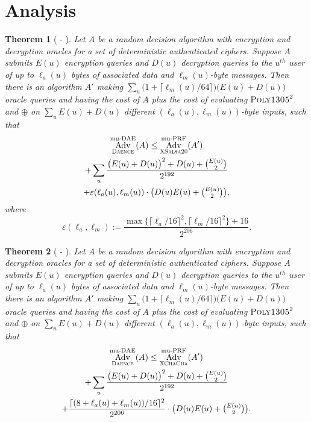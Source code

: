 \documentclass{article}
\newtheorem{theorem}{Theorem}
\def\operatorsc#1{{%
  \ifmmode\let\next=\operatorname\else\let\next=\relax\fi\next{\textsc{#1}}}}
\def\Salsa#1/{\operatorsc{Salsa#1}}
\def\ChaCha#1/{\operatorsc{ChaCha#1}}
\def\XChaCha#1/{\operatorsc{XChaCha#1}}
\def\XSalsa#1/{\operatorsc{XSalsa#1}}
\def\Poly#1/{\operatorsc{Poly#1}}
\def\DAENCE/{\operatorsc{Daence}}
\def\muPRF{%
  \ifmmode\def\next{\operatorname{mu-PRF}}%
    \else\def\next/{mu-\textsc{prf}}%
  \fi\next}
\def\muDAE{%
  \ifmmode\def\next{\operatorname{mu-DAE}}%
    \else\def\next/{mu-\textsc{dae}}%
  \fi\next}
\DeclareMathOperator{\Adv}{Adv}
\newcommand{\collisionbound}{\varepsilon}
\begin{document}
\section{Analysis}

\begin{theorem}[\Salsa20/-\DAENCE/]\label{salsa20-daence}
  Let $A$ be a random decision algorithm with encryption and
   decryption oracles for a set of deterministic authenticated
   ciphers.
  Suppose $A$ submits $E(u)$ encryption queries and $D(u)$ decryption
   queries to the $u^{\mathit{th}}$ user of up to $\ell_a(u)$ bytes of
   associated data and $\ell_m(u)$-byte messages.
  Then there is an algorithm $A'$ making
   $\sum_u \bigl(1 + \lceil\ell_m(u)/64\rceil\bigr)
     \bigl(E(u) + D(u)\bigr)$
   oracle queries and having the cost of $A$ plus the cost of
   evaluating $\Poly1305/^2$ and $\oplus$ on
   $\sum_u E(u) + D(u)$
   different $(\ell_a(u), \ell_m(u))$-byte inputs,
   such that
%
  \begin{multline*}
    \Adv^{\muDAE}_{\DAENCE/}(A)
     \leq \Adv^{\muPRF}_{\XSalsa20/}(A') \\
            + \sum_u
                \frac{\bigl(E(u) + D(u)\bigr)^2 + D(u) + \binom{E(u)}{2}}
                     {2^{192}} \\
                + \collisionbound(\ell_a(u), \ell_m(u))
                  \cdot
                  {\textstyle\bigl(D(u) E(u) + \binom{E(u)}{2}\bigr)},
  \end{multline*}
%
   where
  \[
    \collisionbound(\ell_a, \ell_m)
    := \frac{\max\{\lceil\ell_a/16\rceil^2, \lceil\ell_m/16\rceil^2\}
             + 16}
            {2^{206}}.
  \]
\end{theorem}

\begin{theorem}[\ChaCha/-\DAENCE/]\label{chacha-daence}
  Let $A$ be a random decision algorithm with encryption and
   decryption oracles for a set of deterministic authenticated
   ciphers.
  Suppose $A$ submits $E(u)$ encryption queries and $D(u)$ decryption
   queries to the $u^{\mathit{th}}$ user of up to $\ell_a(u)$ bytes of
   associated data and $\ell_m(u)$-byte messages.
  Then there is an algorithm $A'$ making
   $\sum_u \bigl(1 + \lceil\ell_m(u)/64\rceil\bigr)
     \bigl(E(u) + D(u)\bigr)$
   oracle queries and having the cost of $A$ plus the cost of
   evaluating $\Poly1305/^2$ and $\oplus$ on
   $\sum_u E(u) + D(u)$
   different $(\ell_a(u), \ell_m(u))$-byte inputs,
   such that
%
  \begin{multline*}
    \Adv^{\muDAE}_{\DAENCE/}(A)
     \leq \Adv^{\muPRF}_{\XChaCha/}(A') \\
            + \sum_u
                \frac{\bigl(E(u) + D(u)\bigr)^2 + D(u) + \binom{E(u)}{2}}
                     {2^{192}} \\
                + \frac{\lceil(8 + \ell_a(u) + \ell_m(u))/16\rceil^2}{2^{206}}
                  \cdot
                  {\textstyle\bigl(D(u) E(u) + \binom{E(u)}{2}\bigr)}.
  \end{multline*}
\end{theorem}
\end{document}
